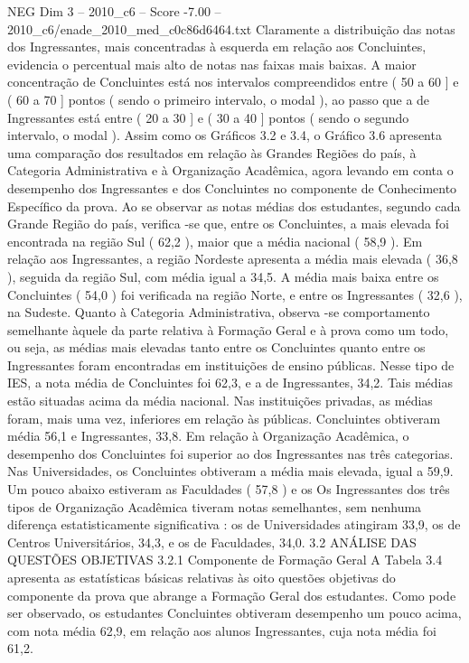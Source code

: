 \begin{textsample}{NEG Dim 3 – 2010\_c6 – Score -7.00 – 2010\_c6/enade\_2010\_med\_c0c86d6464.txt}
Claramente a distribuição das notas dos Ingressantes, mais concentradas à esquerda em relação aos Concluintes, evidencia o percentual mais alto de notas nas faixas mais baixas.
A maior concentração de Concluintes está nos intervalos compreendidos entre ( 50 a 60 ] e ( 60 a 70 ] pontos ( sendo o primeiro intervalo, o modal ), ao passo que a de Ingressantes está entre ( 20 a 30 ] e ( 30 a 40 ] pontos ( sendo o segundo intervalo, o modal ).
Assim como os Gráficos 3.2 e 3.4, o Gráfico 3.6 apresenta uma comparação dos resultados em relação às Grandes Regiões do país, à Categoria Administrativa e à Organização Acadêmica, agora levando em conta o desempenho dos Ingressantes e dos Concluintes no componente de Conhecimento Específico da prova.
Ao se observar as notas médias dos estudantes, segundo cada Grande Região do país, verifica -se que, entre os Concluintes, a mais elevada foi encontrada na região Sul ( 62,2 ), maior que a média nacional ( 58,9 ).
Em relação aos Ingressantes, a região Nordeste apresenta a média mais elevada ( 36,8 ), seguida da região Sul, com média igual a 34,5.
A média mais baixa entre os Concluintes ( 54,0 ) foi verificada na região Norte, e entre os Ingressantes ( 32,6 ), na Sudeste.
Quanto à Categoria Administrativa, observa -se comportamento semelhante àquele da parte relativa à Formação Geral e à prova como um todo, ou seja, as médias mais elevadas tanto entre os Concluintes quanto entre os Ingressantes foram encontradas em instituições de ensino públicas.
Nesse tipo de IES, a nota média de Concluintes foi 62,3, e a de Ingressantes, 34,2.
Tais médias estão situadas acima da média nacional.
Nas instituições privadas, as médias foram, mais uma vez, inferiores em relação às públicas.
Concluintes obtiveram média 56,1 e Ingressantes, 33,8.
Em relação à Organização Acadêmica, o desempenho dos Concluintes foi superior ao dos Ingressantes nas três categorias.
Nas Universidades, os Concluintes obtiveram a média mais elevada, igual a 59,9.
Um pouco abaixo estiveram as Faculdades ( 57,8 ) e os Os Ingressantes dos três tipos de Organização Acadêmica tiveram notas semelhantes, sem nenhuma diferença estatisticamente significativa : os de Universidades atingiram 33,9, os de Centros Universitários, 34,3, e os de Faculdades, 34,0. 3.2 ANÁLISE DAS QUESTÕES OBJETIVAS 3.2.1 Componente de Formação Geral A Tabela 3.4 apresenta as estatísticas básicas relativas às oito questões objetivas do componente da prova que abrange a Formação Geral dos estudantes.
Como pode ser observado, os estudantes Concluintes obtiveram desempenho um pouco acima, com nota média 62,9, em relação aos alunos Ingressantes, cuja nota média foi 61,2.

\end{textsample}
